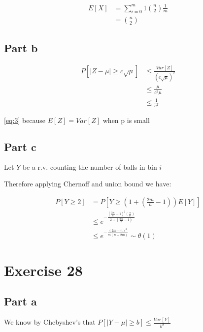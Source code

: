 \documentclass[12pt, a4paper]{article}
\begin{document}
\begin{subequations}
  \begin{align}
    E[X] &= \sum_{i=0}^m 1 \binom{n}{2} \frac{1}{m} \\
         &= \binom{n}{2}
  \end{align}
\end{subequations}

\subsection{Part b}
\begin{subequations}
  \begin{align}
    P[|Z - \mu| \geq c\sqrt{\mu}] &\leq \frac{Var[Z]}{(c\sqrt{\mu})^2}\\
                                  &\leq \frac{\mu}{c^2\mu}\\\label{eq:3}
                                  &\leq \frac{1}{c^2}
  \end{align}
\end{subequations}

\ref{eq:3} because $E[Z] = Var[Z]$ when p is small 

\subsection{Part c}

Let $Y$ be a r.v. counting the number of balls in bin $i$

Therefore applying Chernoff and union bound we have:

\begin{subequations}
  \begin{align}
    P[Y \geq 2] &= P[Y \geq (1 + (\frac{2m}{n} - 1))E[Y]]\\
                &\leq e^{-\frac{(\frac{2m}{n} - 1)^2(\frac{n}{m})}{2 + (\frac{2m}{n} - 1)}}\\
                &\leq e^{-\frac{(2m - n)^2}{m(n + 2m)}} \sim \theta(1)
  \end{align}
\end{subequations}



\section{Exercise 28}
\subsection{Part a}
We know by Chebyshev's that $P[|Y - \mu| \geq b] \leq \frac{Var[Y]}{b^2}$
\end{document}
